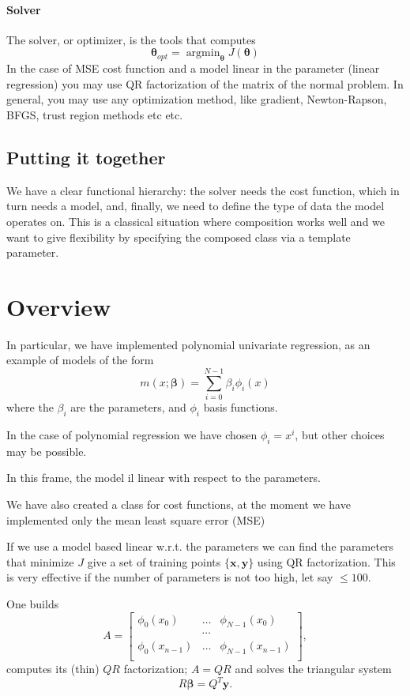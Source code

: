 \documentclass{article}
\begin{document}
 \paragraph{\textbf{Solver}} The solver, or optimizer, is the tools that computes
 \[
   \boldsymbol{\theta}_{opt}=\operatorname{argmin}_{\boldsymbol{\theta}}J(\boldsymbol{\theta})
 \]
 In the case of MSE cost function and a model linear in the parameter (linear regression) you may use QR factorization of the matrix of the normal problem.
 In general, you may use any optimization method, like gradient, Newton-Rapson, BFGS, trust region methods etc etc.

 \subsection{Putting it together}
 We have a clear functional hierarchy: the solver needs the cost function, which in turn needs a model, and, finally, we need to define the type of data
 the model operates on. This is a classical situation where composition
 works well and we want to give flexibility by specifying the composed class via
 a template parameter.
 
 
 \section{Overview}
In particular, we have implemented polynomial univariate regression, as an example of models of the form
\begin{equation}
m(x;\boldsymbol{\beta})=\sum_{i=0}^{N-1} \beta_i\phi_i(x)
\end{equation}
where the $\beta_i$ are the parameters, and $\phi_i$ basis functions.

In the case of polynomial regression we have chosen $\phi_i=x^i$, but other choices may be possible.

In this frame, the model il linear with respect to the parameters.

We have also created a class for cost functions, at the moment we have implemented only the mean least square error (MSE)

If we use a model based linear w.r.t. the parameters we can find the parameters that minimize $J$ give a set of training points $\{\mathbf{x},\mathbf{y}\}$
using QR factorization. This is very effective if the number of parameters is not too high, let say $\le 100$.

One builds
\[
A=\begin{bmatrix}
\phi_0(x_0)&\ldots&\phi_{N-1}(x_{0})\\
&\cdots &\\
\phi_0(x_{n-1})&\ldots&\phi_{N-1}(x_{n-1})\\
\end{bmatrix},
\]
computes its (thin) $QR$ factorization; $A=QR$ and solves the triangular system
\[
R\boldsymbol{\beta}=Q^T\mathbf{y}.
\]
\end{document}

